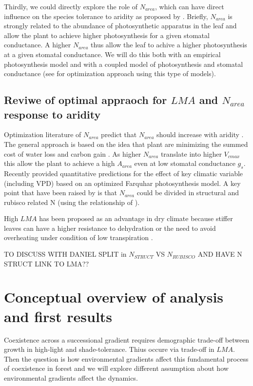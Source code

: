 \documentclass[a4paper,11pt]{article}
\begin{document}
Thirdly, we could directly explore the role of $N_{area}$, which can have direct influence on the species tolerance to aridity as proposed by \citet{Wright-2003}. Briefly, $N_{area}$ is strongly related to the abundance of photosynthetic apparatus in the leaf and allow the plant to achieve higher photosynthesis for a given stomatal conductance. A higher $N_{area}$ thus allow the leaf to achive a higher photosynthesis at a given stomatal conductance. We will do this both with an empirical photosynthesis model and with a coupled model of photosynthesis and stomatal conductance (see \citet{Prentice-2014,Wang-2017} for optimization approach using this type of models).


\subsection{Reviwe of optimal appraoch for $LMA$ and $N_{area}$ response to aridity}

Optimization literature of $N_{area}$ predict that $N_{area}$ should increase with aridity \citep{Wright-2003}.  
The general approach is based on the idea that plant are minimizing the summed cost of water loss and carbon gain \citet{Medlyn-2002,Wright-2003,Prentice-2014,Wolf-2016,Lu-2016,Wang-2017,Sperry-2017,Dong-2017}. As higher $N_{area}$ translate into higher $V_{cmax}$ this allow the plant to achieve a high $A_{area}$ even at low stomatal conductance $g_s$. Recently \citet{Prentice-2014,Dong-2017} provided quantitative predictions for the effect of key climatic variable (including VPD) based on an optimized Farquhar photosynthesis model. A key point that have been raised by \citet{Dong-2017} is that $N_{area}$ could be divided in structural and rubisco related N (using the relationship of \citet{Onoda-2004}).  

High $LMA$ has been proposed as an advantage in dry climate because stiffer leaves can have a higher resistance to dehydration \citep{Wright-2002a,Wright-2002b} or the need to avoid overheating under condition of low transpiration \citep{Leigh-2012}.

{\color{red}TO DISCUSS WITH DANIEL SPLIT in $N_{STRUCT}$ VS $N_{RUBISCO}$ AND HAVE N STRUCT LINK TO LMA??}


\section{Conceptual overview of analysis and first results}


Coexistence across a successional gradient requires demographic trade-off between growth in high-light and shade-tolerance. Thius occure via trade-off in $LMA$. Then the question is how environmental gradients affect this fundamental process of coexistence in forest and we will explore different assumption about how environmental gradients affect the dynamics.
\end{document}
